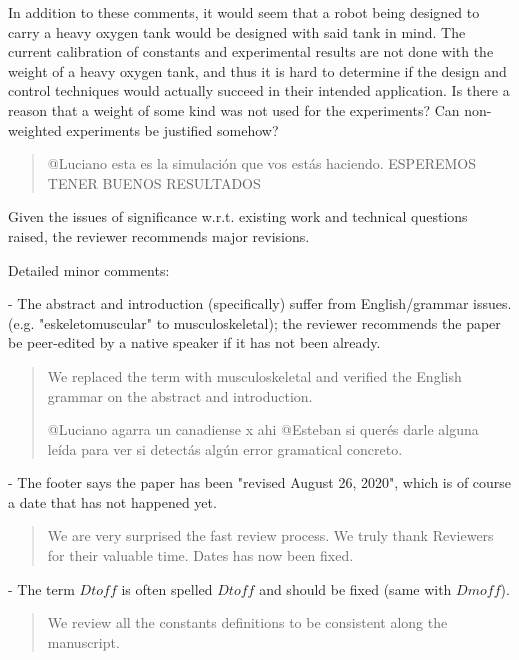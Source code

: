 \documentclass[journal,onecolumn,12pt]{IEEEtran}
\begin{document}
In addition to these comments, it would seem that a robot being designed to carry a heavy oxygen tank would be designed with said tank in mind. The current calibration of constants and experimental results are not done with the weight of a heavy oxygen tank, and thus it is hard to determine if the design and control techniques would actually succeed in their intended application. Is there a reason that a weight of some kind was not used for the experiments? Can non-weighted experiments be justified somehow?

\begin{quotation}
{\color{blue}
@Luciano esta es la simulación que vos estás haciendo.  ESPEREMOS TENER BUENOS RESULTADOS
}
\end{quotation}

Given the issues of significance w.r.t. existing work and technical questions raised, the reviewer recommends major revisions.  

Detailed minor comments:

- The abstract and introduction (specifically) suffer from English/grammar issues. (e.g. "eskeletomuscular" to musculoskeletal); the reviewer recommends the paper be peer-edited by a native speaker if it has not been already.

\begin{quotation}
{\color{blue}
We replaced the term with musculoskeletal and verified the English grammar on the abstract and introduction.

@Luciano agarra un canadiense x ahi
@Esteban si querés darle alguna leída para ver si detectás algún error gramatical concreto.
}
\end{quotation}

- The footer says the paper has been "revised August 26, 2020", which is of course a date that has not happened yet.

\begin{quotation}
{\color{blue}
We are very surprised the fast review process.  We truly thank Reviewers for their valuable time.  Dates has now been fixed.
}
\end{quotation}

- The term $Dt{off}$ is often spelled $Dt{o}ff$ and should be fixed (same with $Dm{off}$).

\begin{quotation}
{\color{blue}
We review all the constants definitions to be consistent along the manuscript.
}
\end{quotation}
\end{document}
